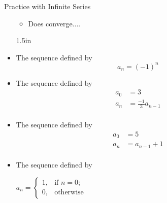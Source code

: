 \begin{exercise}{Practice with Infinite Series \Coffeecup \Coffeecup \Coffeecup}
\begin{itemize}
{\begin{itemize}
    \item Does converge....
        \end{itemize}
    }{1.5in}
\item The sequence defined by $$ a_n=\left(-1\right)^n$$
\vspace*{1.5in}
\item The sequence defined by \begin{align*}
 a_0&=3 \\ 
 a_n&=\frac{-1}{3}a_{n-1} \\
\end{align*}
\vspace*{1.5in}
\item The sequence defined by \begin{align*}
 a_0&=5 \\ 
 a_n&=a_{n-1}+1 \\
\end{align*}
\vspace*{1.5in}
\item The sequence defined by \begin{center}
$a_n=\begin{cases}
1, & \text{if $n=0$;} \\
0, & \text{otherwise}
\end{cases}$
\end{center}
\vspace*{1.5in}
\end{itemize}
\end{exercise}
